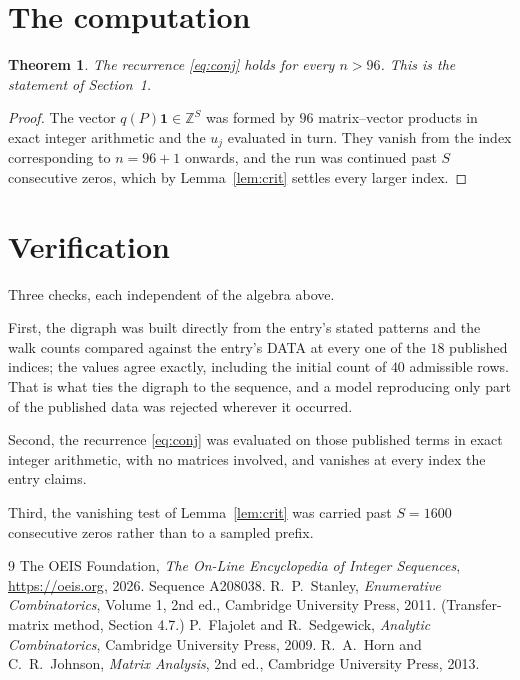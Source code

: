 \documentclass[11pt,a4paper]{article}
\theoremstyle{plain}
\newtheorem{theorem}{Theorem}
\theoremstyle{definition}
\begin{document}
\section{The computation}

\begin{theorem}
The recurrence \eqref{eq:conj} holds for every $n>96$. This is the statement of
Section~1.
\end{theorem}

\begin{proof}
The vector $q(P)\mathbf{1}\in\mathbb{Z}^{S}$ was formed by $96$ matrix--vector
products in exact integer arithmetic and the $u_j$ evaluated in turn. They vanish from the
index corresponding to $n=96+1$ onwards, and the run was continued past $S$ consecutive
zeros, which by Lemma~\ref{lem:crit} settles every larger index.
\end{proof}

\section{Verification}

Three checks, each independent of the algebra above.

First, the digraph was built directly from the entry's stated patterns and the walk counts
compared against the entry's DATA at every one of the $18$ published indices; the
values agree exactly, including the initial count of $40$ admissible rows. That is
what ties the digraph to the sequence, and a model reproducing only part of the published
data was rejected wherever it occurred.

Second, the recurrence \eqref{eq:conj} was evaluated on those published terms in exact
integer arithmetic, with no matrices involved, and vanishes at every index the entry claims.

Third, the vanishing test of Lemma~\ref{lem:crit} was carried past $S=1600$ consecutive
zeros rather than to a sampled prefix.

\begin{thebibliography}{9}
 The OEIS Foundation, \emph{The On-Line Encyclopedia of Integer
Sequences}, \url{https://oeis.org}, 2026. Sequence A208038.
 R.~P.~Stanley, \emph{Enumerative Combinatorics}, Volume 1, 2nd ed.,
Cambridge University Press, 2011. (Transfer-matrix method, Section 4.7.)
 P.~Flajolet and R.~Sedgewick, \emph{Analytic Combinatorics}, Cambridge
University Press, 2009.
 R.~A.~Horn and C.~R.~Johnson, \emph{Matrix Analysis}, 2nd ed., Cambridge
University Press, 2013.
\end{thebibliography}
\end{document}
